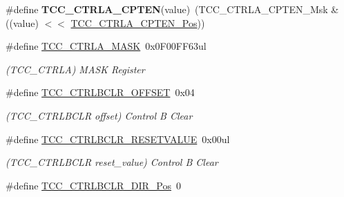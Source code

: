 \begin{DoxyCompactItemize}
\item 
\hypertarget{group___s_a_m_l21___t_c_c_gab8368fba6386d568914406e11461960e}{}\#define {\bfseries T\+C\+C\+\_\+\+C\+T\+R\+L\+A\+\_\+\+C\+P\+T\+E\+N}(value)~(T\+C\+C\+\_\+\+C\+T\+R\+L\+A\+\_\+\+C\+P\+T\+E\+N\+\_\+\+Msk \& ((value) $<$$<$ \hyperlink{group___s_a_m_l21___t_c_c_gaf3b55ef061eed41402b7730cbf8085ca}{T\+C\+C\+\_\+\+C\+T\+R\+L\+A\+\_\+\+C\+P\+T\+E\+N\+\_\+\+Pos}))\label{group___s_a_m_l21___t_c_c_gab8368fba6386d568914406e11461960e}

\item 
\hypertarget{group___s_a_m_l21___t_c_c_ga8ba7fc2384d175bc1e46f7d90fd8438f}{}\#define \hyperlink{group___s_a_m_l21___t_c_c_ga8ba7fc2384d175bc1e46f7d90fd8438f}{T\+C\+C\+\_\+\+C\+T\+R\+L\+A\+\_\+\+M\+A\+S\+K}~0x0\+F00\+F\+F63ul\label{group___s_a_m_l21___t_c_c_ga8ba7fc2384d175bc1e46f7d90fd8438f}

\begin{DoxyCompactList}\small\item\em (T\+C\+C\+\_\+\+C\+T\+R\+L\+A) M\+A\+S\+K Register \end{DoxyCompactList}\item 
\hypertarget{group___s_a_m_l21___t_c_c_ga3d7fd5a84e67bfb95ec599967a91270d}{}\#define \hyperlink{group___s_a_m_l21___t_c_c_ga3d7fd5a84e67bfb95ec599967a91270d}{T\+C\+C\+\_\+\+C\+T\+R\+L\+B\+C\+L\+R\+\_\+\+O\+F\+F\+S\+E\+T}~0x04\label{group___s_a_m_l21___t_c_c_ga3d7fd5a84e67bfb95ec599967a91270d}

\begin{DoxyCompactList}\small\item\em (T\+C\+C\+\_\+\+C\+T\+R\+L\+B\+C\+L\+R offset) Control B Clear \end{DoxyCompactList}\item 
\hypertarget{group___s_a_m_l21___t_c_c_gab5ec2d83d7a2ff6c3380d47aff6db3c1}{}\#define \hyperlink{group___s_a_m_l21___t_c_c_gab5ec2d83d7a2ff6c3380d47aff6db3c1}{T\+C\+C\+\_\+\+C\+T\+R\+L\+B\+C\+L\+R\+\_\+\+R\+E\+S\+E\+T\+V\+A\+L\+U\+E}~0x00ul\label{group___s_a_m_l21___t_c_c_gab5ec2d83d7a2ff6c3380d47aff6db3c1}

\begin{DoxyCompactList}\small\item\em (T\+C\+C\+\_\+\+C\+T\+R\+L\+B\+C\+L\+R reset\+\_\+value) Control B Clear \end{DoxyCompactList}\item 
\hypertarget{group___s_a_m_l21___t_c_c_gafe5756dea3f53f2f3121cb9f8c3c2f0e}{}\#define \hyperlink{group___s_a_m_l21___t_c_c_gafe5756dea3f53f2f3121cb9f8c3c2f0e}{T\+C\+C\+\_\+\+C\+T\+R\+L\+B\+C\+L\+R\+\_\+\+D\+I\+R\+\_\+\+Pos}~0\label{group___s_a_m_l21___t_c_c_gafe5756dea3f53f2f3121cb9f8c3c2f0e}


\end{DoxyCompactItemize}
